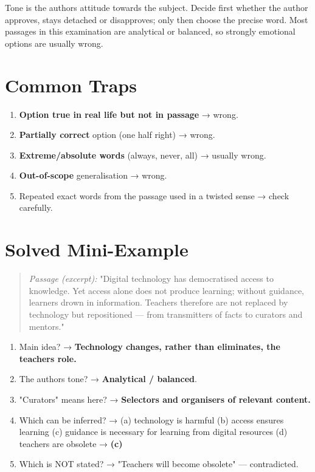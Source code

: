 Tone is the author\textquotesingle s attitude towards the subject. Decide first whether the author approves, stays
detached or disapproves; only then choose the precise word. Most passages in this examination are
analytical or balanced, so strongly emotional options are usually wrong.



\needspace{95pt}

\hypertarget{p1-03--common-traps}{%
\section{Common Traps}\label{p1-03--common-traps}}

\begin{enumerate}
\def\labelenumi{\arabic{enumi}.}
\tightlist
\item
  \textbf{Option true in real life but not in passage} → wrong.
\item
  \textbf{Partially correct} option (one half right) → wrong.
\item
  \textbf{Extreme/absolute words} (always, never, all) → usually wrong.
\item
  \textbf{Out-of-scope} generalisation → wrong.
\item
  Repeated exact words from the passage used in a twisted sense → check carefully.
\end{enumerate}

\needspace{95pt}

\hypertarget{p1-03--solved-mini-example}{%
\section{Solved Mini-Example}\label{p1-03--solved-mini-example}}

\begin{quote}
\emph{Passage (excerpt):} "Digital technology has democratised access to knowledge. Yet access alone does not
produce learning; without guidance, learners drown in information. Teachers therefore are not replaced by
technology but repositioned --- from transmitters of facts to curators and mentors."
\end{quote}

\begin{enumerate}
\def\labelenumi{\arabic{enumi}.}
\tightlist
\item
  Main idea? → \textbf{Technology changes, rather than eliminates, the teacher\textquotesingle s role.}
\item
  The author\textquotesingle s tone? → \textbf{Analytical / balanced}.
\item
  "Curators" means here? → \textbf{Selectors and organisers of relevant content.}
\item
  Which can be inferred? → (a) technology is harmful (b) access ensures learning (c) guidance is necessary for learning from digital resources (d) teachers are obsolete → \textbf{(c)}
\item
  Which is NOT stated? → "Teachers will become obsolete" --- contradicted.
\end{enumerate}

